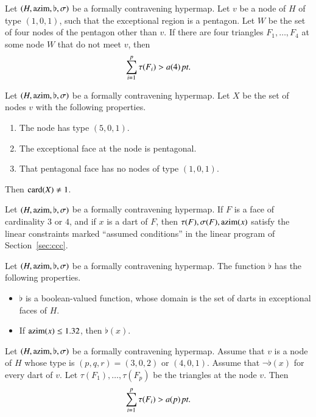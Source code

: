 \begin{lemma} Let $(H,{\operatorname{azim}},\flat,\sigma)$ be a formally contravening
hypermap.  Let $v$ be a node of $H$ of type $(1,0,1)$, such that the
exceptional region is a pentagon.  Let $W$ be the set of four nodes
of the pentagon other than $v$.  If there are four triangles
$F_1,\ldots,F_4$ at some node $W$ that do not meet $v$, then
    $$\sum_{i=1}^p \tau(F_i) > a(4)\,\hbox{\it pt}.$$
\end{lemma}

\begin{lemma}
Let $(H,{\operatorname{azim}},\flat,\sigma)$ be a formally contravening hypermap.
Let $X$ be the set of nodes $v$ with the following properties.
    \begin{enumerate}
    \item The node has type $(5,0,1)$.
    \item The exceptional face at the node is pentagonal.
    \item That pentagonal face has no nodes of type $(1,0,1)$.
    \end{enumerate}
Then ${\operatorname{card}}(X)\ne 1$.
\end{lemma}

\begin{lemma}  Let $(H,{\operatorname{azim}},\flat,\sigma)$ be a formally contravening
hypermap.  If $F$ is a face of cardinality $3$ or $4$, and if $x$ is
a dart of $F$, then $\tau(F),\sigma(F),{\operatorname{azim}}(x)$ satisfy the linear
constraints marked {``assumed conditions''} in the linear program of
Section~\ref{sec:ccc}.
\end{lemma}

\begin{lemma} Let $(H,{\operatorname{azim}},\flat,\sigma)$ be a formally contravening
hypermap.  The function $\flat$ has the following properties.
    \begin{itemize}
    \item $\flat$ is a boolean-valued function, whose
     domain is the set of darts in exceptional faces of
    $H$.
    \item If ${\operatorname{azim}}(x)\le 1.32$, then $\flat(x)$.
    \end{itemize}
\end{lemma}

\begin{lemma}  Let $(H,{\operatorname{azim}},\flat,\sigma)$ be a formally contravening
hypermap. Assume that $v$ is a node of $H$ whose type is
$(p,q,r)=(3,0,2)$ or $(4,0,1)$.  Assume that $\neg\flat(x)$ for
every dart of $v$.  Let $\tau(F_1),\ldots,\tau(F_p)$ be the
triangles at the node $v$.  Then
    $$
    \sum_{i=1}^p \tau(F_i) > a(p)\,\hbox{\it pt}.
    $$
\end{lemma}



